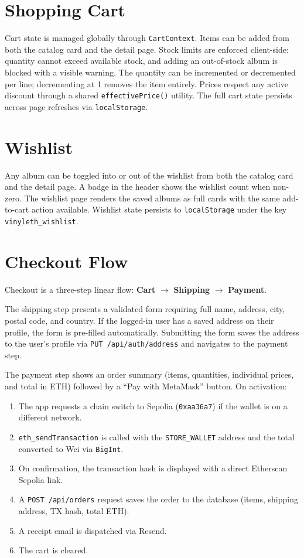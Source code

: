 \documentclass[11pt, a4paper]{report}
\begin{document}
\section{Shopping Cart}

Cart state is managed globally through \texttt{CartContext}. Items can be added from both the catalog card and the detail page. Stock limits are enforced client-side: quantity cannot exceed available stock, and adding an out-of-stock album is blocked with a visible warning. The quantity can be incremented or decremented per line; decrementing at 1 removes the item entirely. Prices respect any active discount through a shared \texttt{effectivePrice()} utility. The full cart state persists across page refreshes via \texttt{localStorage}.

\section{Wishlist}

Any album can be toggled into or out of the wishlist from both the catalog card and the detail page. A badge in the header shows the wishlist count when non-zero. The wishlist page renders the saved albums as full cards with the same add-to-cart action available. Wishlist state persists to \texttt{localStorage} under the key \texttt{vinyleth\_wishlist}.

\section{Checkout Flow}

Checkout is a three-step linear flow: \textbf{Cart} $\rightarrow$ \textbf{Shipping} $\rightarrow$ \textbf{Payment}.

The shipping step presents a validated form requiring full name, address, city, postal code, and country. If the logged-in user has a saved address on their profile, the form is pre-filled automatically. Submitting the form saves the address to the user's profile via \texttt{PUT /api/auth/address} and navigates to the payment step.

The payment step shows an order summary (items, quantities, individual prices, and total in ETH) followed by a ``Pay with MetaMask'' button. On activation:

\begin{enumerate}
  \item The app requests a chain switch to Sepolia (\texttt{0xaa36a7}) if the wallet is on a different network.
  \item \texttt{eth\_sendTransaction} is called with the \texttt{STORE\_WALLET} address and the total converted to Wei via \texttt{BigInt}.
  \item On confirmation, the transaction hash is displayed with a direct Etherscan Sepolia link.
  \item A \texttt{POST /api/orders} request saves the order to the database (items, shipping address, TX hash, total ETH).
  \item A receipt email is dispatched via Resend.
  \item The cart is cleared.
\end{enumerate}
\end{document}
